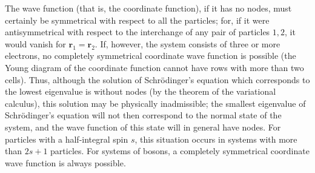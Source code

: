 The wave function (that is, the coordinate function), if it has no nodes, must certainly be symmetrical with respect to all the particles; for, if it were antisymmetrical with respect to the interchange of any pair of particles $ 1, 2 $, it would vanish for $ \bm{r}_1 = \bm{r}_2 $. If, however, the system consists of three or more electrons, no completely symmetrical coordinate wave function is possible (the Young diagram of the coordinate function cannot have rows with more than two cells). Thus, although the solution of Schr\"odinger’s equation which corresponds to the lowest eigenvalue is without nodes (by the theorem of the variational calculus), this solution may be physically inadmissible; the smallest eigenvalue of Schr\"odinger’s equation will not then correspond to the normal state of the system, and the wave function of this state will in general have nodes. For particles with a half-integral spin $ s $, this situation occurs in systems with more than $ 2s + 1 $ particles. For systems of bosons, a completely symmetrical coordinate wave function is always possible.





